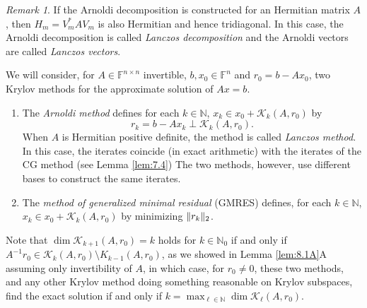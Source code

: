 \documentclass[12pt]{article}
\theoremstyle{definition}
\theoremstyle{remark}
\newtheorem{remark}[theorem]{Remark}
\numberwithin{equation}{section}
\newcommand{\F}{\mathbb{F}}
\newcommand{\N}{\mathbb{N}}
\newcommand{\K}{\mathcal{K}}
\DeclarePairedDelimiter{\norm}{\lVert}{\rVert}
\begin{document}
  \begin{remark}
    \label{rem:9.7}
    If the Arnoldi decomposition is constructed for an Hermitian matrix $A$, then $H_m = V_m^* A V_m$ is also Hermitian and hence tridiagonal. In this case, the Arnoldi decomposition is called \emph{Lanczos decomposition} and the Arnoldi vectors are called \emph{Lanczos vectors}.
  \end{remark}
  We will consider, for $A \in \F^{n\times n}$ invertible, $b, x_0 \in \F^n$ and $r_0 = b - Ax_0$, two Krylov methods for the approximate solution of $Ax = b$.
  \begin{enumerate}[label=(\roman*)]
    \item The \emph{Arnoldi method} defines for each $k \in \N$, $x_k \in x_0 + \K_k(A,r_0)$ by
      \begin{equation*}
        r_k = b - Ax_k \perp \K_k(A,r_0).
      \end{equation*}
      When $A$ is Hermitian positive definite, the method is called \emph{Lanczos method}. In this case, the iterates coincide (in exact arithmetic) with the iterates of the CG method (see Lemma \ref{lem:7.4}) The two methods, however, use different bases to construct the same iterates.
    \item The \emph{method of generalized minimal residual} (GMRES) defines, for each $k \in \N$, $x_k \in x_0 + \K_k(A,r_0)$ by minimizing $\norm{r_k}_2$.
  \end{enumerate}
  Note that $\dim \K_{k+1}(A,r_0) = k$ holds for $k \in \N_0$ if and only if $A^{-1} r_0 \in \K_k(A,r_0) \setminus K_{k-1}(A,r_0)$, as we showed in Lemma \ref{lem:8.1A}A assuming only invertibility of $A$, in which case, for $r_0 \neq 0$, these two methods, and any other Krylov method doing something reasonable on Krylov subspaces, find the exact solution if and only if $k = \max_{\ell \in \N} \dim \K_{\ell}(A,r_0)$.
  
\end{document}
